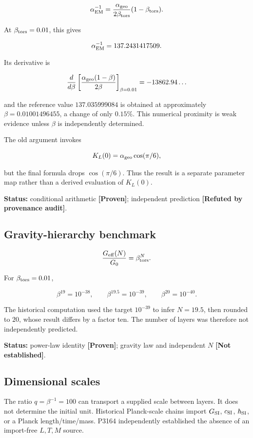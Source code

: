 \documentclass[11pt,a4paper,openany]{report}
\newcommand{\statusProven}{\textcolor{fingreen}{[Proven]}}
\begin{document}
\[
\alpha_{\rm EM}^{-1}
=
\frac{\alpha_{\rm geo}}{2\beta_{\rm tors}}
(1-\beta_{\rm tors}).
\]

At \(\beta_{\rm tors}=0.01\), this gives

\[
\alpha_{\rm EM}^{-1}=137.2431417509.
\]

Its derivative is

\[
\frac{d}{d\beta}
\left[
\frac{\alpha_{\rm geo}(1-\beta)}{2\beta}
\right]_{\beta=0.01}
=
-13862.94\ldots
\]

and the reference value \(137.035999084\) is obtained at approximately \(\beta=0.01001496455\), a change of only \(0.15\%\). This numerical proximity is weak evidence unless \(\beta\) is independently determined.

The old argument invokes

\[
K_L(0)=\alpha_{\rm geo}\cos(\pi/6),
\]

but the final formula drops \(\cos(\pi/6)\). Thus the result is a separate parameter map rather than a derived evaluation of \(K_L(0)\).

\textbf{Status:} conditional arithmetic \textbf{\statusProven{}}; independent prediction \textbf{[Refuted by provenance audit]}.

\subsection{Gravity-hierarchy benchmark}

\[
\frac{G_{\rm eff}(N)}{G_0}=\beta_{\rm tors}^{N}.
\]

For \(\beta_{\rm tors}=0.01\),

\[
\beta^{19}=10^{-38},\qquad
\beta^{19.5}=10^{-39},\qquad
\beta^{20}=10^{-40}.
\]

The historical computation used the target \(10^{-39}\) to infer \(N=19.5\), then rounded to \(20\), whose result differs by a factor ten. The number of layers was therefore not independently predicted.

\textbf{Status:} power-law identity \textbf{\statusProven{}}; gravity law and independent \(N\) \textbf{[Not established]}.

\subsection{Dimensional scales}

The ratio \(q=\beta^{-1}=100\) can transport a supplied scale between layers. It does not determine the initial unit. Historical Planck-scale chains import \(G_{\rm SI}\), \(c_{\rm SI}\), \(\hbar_{\rm SI}\), or a Planck length/\allowbreak{}time/\allowbreak{}mass. P3164 independently established the absence of an import-free \(L,T,M\) source.
\end{document}
